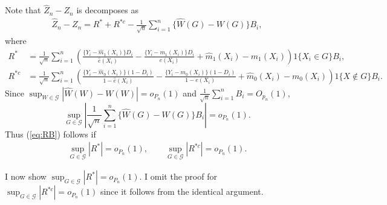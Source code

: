 \documentclass[12pt,oneside,reqno,english]{amsart}
\theoremstyle{definition}
\begin{document}
Note that $\hat{Z}_{n}-Z_{n}$ is decomposes as 
\begin{align*}
\hat{Z}_{n}-Z_{n}=R^{*}+R^{*c}-\frac{1}{\sqrt{n}}\sum_{i=1}^{n}\{\hat{W}(G)-W(G)\}B_{i},
\end{align*}
where 
\begin{align*}
R^{*}&=\frac{1}{\sqrt{n}}\sum_{i=1}^{n}\left(\frac{\{Y_{i}-\hat{m}_{1}(X_{i})\}D_{i}}{\hat{e}(X_{i})}-\frac{\{Y_{i}-m_{1}(X_{i})\}D_{i}}{e(X_{i})}+\hat{m}_{1}(X_{i})
-m_{1}(X_{i})\right)1\{X_{i}\in G\}B_{i},\\
R^{*c}&=\frac{1}{\sqrt{n}}\sum_{i=1}^{n}\left(\frac{\{Y_{i}-\hat{m}_{0}(X_{i})\}(1-D_{i})}{1-\hat{e}(X_{i})}-\frac{\{Y_{i}-m_{0}(X_{i})\}(1-D_{i})}{1-e(X_{i})}+\hat{m}_{0}(X_{i})
-m_{0}(X_{i})\right)1\{X\not\in G\}B_{i}.
\end{align*}
Since $\sup_{W\in \mathcal{G}}|\hat{W}(W)-W(W)|=o_{P_{n}}(1)$ and 
 $\frac{1}{\sqrt{n}}\sum_{i=1}^{n}B_{i}=O_{p_{n}}(1)$, 
\[\sup_{G\in \mathcal{G}}\left| \frac{1}{\sqrt{n}}\sum_{i=1}^{n}\{\hat{W}(G)-W(G)\}B_{i}\right|=o_{P_{n}}(1).\]
Thus (\ref{eq:RB}) follows if 
\begin{align*}
\sup_{G\in \mathcal{G}}|R^{*}|=o_{P_{n}}(1),\qquad \sup_{G\in \mathcal{G}}|R^{*c}|=o_{P_{n}}(1).
\end{align*}

I now show $\sup_{G\in \mathcal{G}}|R^{*}|=o_{P_{n}}(1)$. I omit the proof for $\sup_{G\in \mathcal{G}}|R^{*c}|=o_{P_{n}}(1)$ since it follows from the identical argument. 
\end{document}
